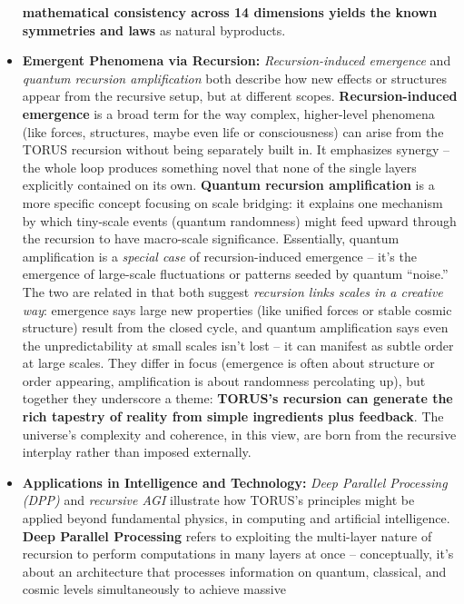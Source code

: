 \documentclass[
]{article}
\begin{document}
\begin{itemize}
  \textbf{mathematical consistency across 14 dimensions yields the known
  symmetries and laws} as natural byproducts.
\item
  \textbf{Emergent Phenomena via Recursion:} \emph{Recursion-induced
  emergence} and \emph{quantum recursion amplification} both describe
  how new effects or structures appear from the recursive setup, but at
  different scopes. \textbf{Recursion-induced emergence} is a broad term
  for the way complex, higher-level phenomena (like forces, structures,
  maybe even life or consciousness) can arise from the TORUS recursion
  without being separately built in. It emphasizes synergy -- the whole
  loop produces something novel that none of the single layers
  explicitly contained on its own\hspace{0pt}. \textbf{Quantum recursion
  amplification} is a more specific concept focusing on scale bridging:
  it explains one mechanism by which tiny-scale events (quantum
  randomness) might feed upward through the recursion to have
  macro-scale significance\hspace{0pt}. Essentially, quantum
  amplification is a \emph{special case} of recursion-induced emergence
  -- it's the emergence of large-scale fluctuations or patterns seeded
  by quantum ``noise.'' The two are related in that both suggest
  \emph{recursion links scales in a creative way}: emergence says large
  new properties (like unified forces or stable cosmic structure) result
  from the closed cycle, and quantum amplification says even the
  unpredictability at small scales isn't lost -- it can manifest as
  subtle order at large scales. They differ in focus (emergence is often
  about structure or order appearing, amplification is about randomness
  percolating up), but together they underscore a theme: \textbf{TORUS's
  recursion can generate the rich tapestry of reality from simple
  ingredients plus feedback}. The universe's complexity and coherence,
  in this view, are born from the recursive interplay rather than
  imposed externally.
\item
  \textbf{Applications in Intelligence and Technology:} \emph{Deep
  Parallel Processing (DPP)} and \emph{recursive AGI} illustrate how
  TORUS's principles might be applied beyond fundamental physics, in
  computing and artificial intelligence. \textbf{Deep Parallel
  Processing} refers to exploiting the multi-layer nature of recursion
  to perform computations in many layers at once -- conceptually, it's
  about an architecture that processes information on quantum,
  classical, and cosmic levels simultaneously to achieve massive

\end{itemize}
\end{document}
